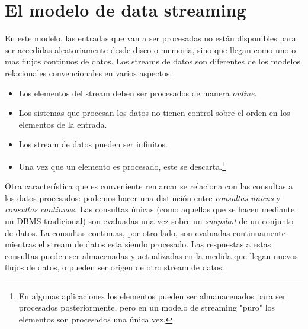 \documentclass[a4paper,10pt, oneside]{article}
\begin{document}
\section{El modelo de data streaming}

En este modelo, las entradas que van a ser procesadas no están disponibles para ser accedidas aleatoriamente desde disco o memoria, sino que llegan como uno o mas flujos continuos de datos. Los streams de datos son diferentes de los modelos relacionales convencionales en varios aspectos: 
\begin{itemize}
	\item Los elementos del stream deben ser procesados de manera \textit{online}.
	\item Los sistemas que procesan los datos no tienen control sobre el orden en los elementos de la entrada.
	\item Los stream de datos pueden ser infinitos.
	\item Una vez que un elemento es procesado, este se descarta.\footnote{En algunas aplicaciones los elementos pueden ser almanacenados para ser procesados posteriormente, pero en un modelo de streaming "puro" los elementos son procesados una única vez.}
\end{itemize}

Otra característica que es conveniente remarcar se relaciona con las consultas a los datos procesados: podemos hacer una distinción entre \textit{consultas únicas} y \textit{consultas continuas}\cite{Terry:1992:CQO:141484.130333}. Las consultas únicas (como aquellas que se hacen mediante un DBMS tradicional) son evaluadas una vez sobre un \textit{snapshot} de un conjunto de datos. La consultas continuas, por otro lado, son evaluadas continuamente mientras el stream de datos esta siendo procesado. Las respuestas a estas consultas pueden ser almacenadas y actualizadas en la medida que llegan nuevos flujos de datos, o pueden ser origen de otro stream de datos.
\end{document}
